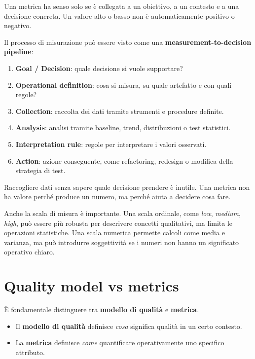 \begin{notaesame}
Una metrica ha senso solo se è collegata a un obiettivo, a un contesto e a una decisione concreta. Un valore alto o basso non è automaticamente positivo o negativo.
\end{notaesame}

Il processo di misurazione può essere visto come una \textbf{measurement-to-decision pipeline}:

\begin{enumerate}
    \item \textbf{Goal / Decision}: quale decisione si vuole supportare?
    \item \textbf{Operational definition}: cosa si misura, su quale artefatto e con quali regole?
    \item \textbf{Collection}: raccolta dei dati tramite strumenti e procedure definite.
    \item \textbf{Analysis}: analisi tramite baseline, trend, distribuzioni o test statistici.
    \item \textbf{Interpretation rule}: regole per interpretare i valori osservati.
    \item \textbf{Action}: azione conseguente, come refactoring, redesign o modifica della strategia di test.
\end{enumerate}

\begin{notaprof}
Raccogliere dati senza sapere quale decisione prendere è inutile. Una metrica non ha valore perché produce un numero, ma perché aiuta a decidere cosa fare.
\end{notaprof}

Anche la scala di misura è importante. Una scala ordinale, come \emph{low}, \emph{medium}, \emph{high}, può essere più robusta per descrivere concetti qualitativi, ma limita le operazioni statistiche. Una scala numerica permette calcoli come media e varianza, ma può introdurre soggettività se i numeri non hanno un significato operativo chiaro.

\section{Quality model vs metrics}

È fondamentale distinguere tra \textbf{modello di qualità} e \textbf{metrica}.

\begin{itemize}
    \item Il \textbf{modello di qualità} definisce \emph{cosa} significa qualità in un certo contesto.
    \item La \textbf{metrica} definisce \emph{come} quantificare operativamente uno specifico attributo.
\end{itemize}

